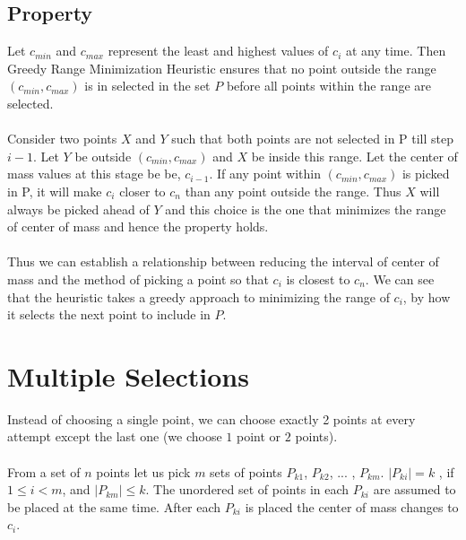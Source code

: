 \documentclass[11pt]{article} %
\begin{document}
\subsection{Property}
	Let $c_{min}$ and $c_{max}$ represent the least and highest values of $c_i$ at any time. Then Greedy Range Minimization Heuristic ensures that no point outside the range $\left( c_{min}, c_{max} \right)$ is in selected in the set $P$ before all points within the range are selected.\\
	\\
	Consider two points $X$ and $Y$ such that both points are not selected in P till step $i-1$. Let $Y$ be outside $\left( c_{min}, c_{max} \right)$ and $X$ be inside this range. Let the center of mass values at this stage be be, $c_{i-1}$. If any point within $\left( c_{min}, c_{max} \right)$ is picked in P, it will make $c_i$ closer to $c_{n}$ than any point outside the range. Thus $X$ will always be picked ahead of $Y$ and this choice is the one that minimizes the range of center of mass and hence the property holds. \\
	\\
	Thus we can establish a relationship between reducing the interval of center of mass and the method of picking a point so that $c_i$ is closest to $c_{n}$. We can see that the heuristic takes a greedy approach to minimizing the range of $c_i$, by how it selects the next point to include in $P$.

\section{Multiple Selections}
Instead of choosing a single point, we can choose exactly 2 points at every attempt except the last one (we choose $1$ point or $2$ points).\\
\\
From a set of $n$ points let us pick $m$ sets of points $P_{k1}$, $P_{k2}$, ... , $P_{km}$. $\left\vert{P_{ki}}\right\vert = k$ , if $1 \leq i < m$, and $\left\vert{P_{km}}\right\vert \leq k$. The unordered set of points in each $P_{ki}$ are assumed to be placed at the same time. After each $P_{ki}$ is placed the center of mass changes to $c_i$.
\end{document}
